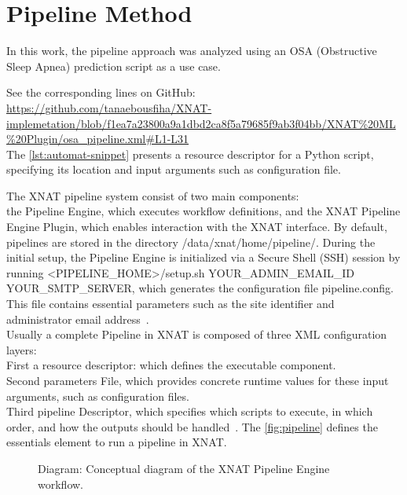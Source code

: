 
\section{Pipeline Method}
In this work, the pipeline approach was analyzed using an OSA (Obstructive Sleep Apnea) prediction script as a use case.
\normalsize



\noindent\footnotesize See the corresponding lines on GitHub:\url{ https://github.com/tanaebousfiha/XNAT-implemetation/blob/f1ea7a23800a9a1dbd2ca8f5a79685f9ab3f04bb/XNAT%20ML%20Plugin/osa_pipeline.xml#L1-L31}
\normalsize
\\
The \autoref{lst:automat-snippet} presents a resource descriptor for a Python script, specifying its location and input arguments such as configuration file.

The XNAT pipeline system consist of two main components: \\
the Pipeline Engine, which executes workflow definitions, and the XNAT Pipeline Engine Plugin, which enables interaction with the XNAT interface.
By default, pipelines are stored in the directory /data/xnat/home/pipeline/. During the initial setup, the Pipeline Engine is initialized via a Secure Shell (SSH) session by running
<PIPELINE\_HOME>/setup.sh YOUR\_ADMIN\_EMAIL\_ID YOUR\_SMTP\_SERVER,
which generates the configuration file pipeline.config. This file contains essential parameters such as the site identifier and administrator email address~\cite{installpipeline}.\\
Usually a complete Pipeline in XNAT is composed of three XML configuration layers:\\
First a resource descriptor: which defines the executable component. \\
Second parameters File, which provides concrete runtime values for these input arguments, such as configuration files.\\
Third pipeline Descriptor, which  specifies which scripts to execute, in which order, and how the outputs should be handled~\cite{pipelinediscussion}. The \autoref{fig:pipeline} defines the essentials element to run a pipeline in XNAT. 
\begin{figure}[H]
    \centering
    \def\svgwidth{0.7\linewidth}
    
    \caption{ Diagram: Conceptual diagram of the XNAT Pipeline Engine workflow.}
    \label{fig:pipeline}
\end{figure}


